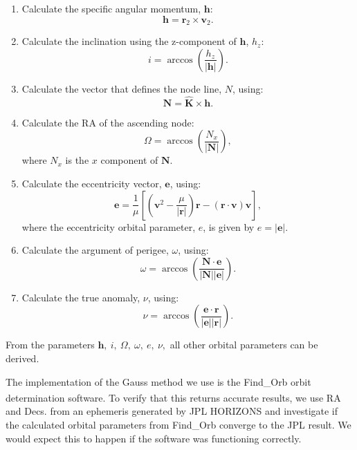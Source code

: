 \documentclass[10pt, twocolumn]{revtex4}    %
\newcommand{\scite}[1]{\textsuperscript{\cite{#1}}}
\begin{document}
\begin{enumerate}
 \item Calculate the specific angular momentum, $\mathbf{h}$:
 \begin{equation}
 \mathbf{h} = \mathbf{r}_2 \times \mathbf{v}_2 .
 \end{equation} 
 \item Calculate the inclination using the z-component of $\mathbf{h}$, $h_z$:
 \begin{equation}
 i = \arccos\left( \frac{h_z}{|\mathbf{h}|} \right) .
 \end{equation}
 \item Calculate the vector that defines the node line, $N$, using:
 \begin{equation}
 \mathbf{N} = \mathbf{\hat{K}} \times \mathbf{h} .
 \end{equation} 
 \item Calculate the RA of the ascending node:
 \begin{equation}
 \Omega = \arccos \left( \frac{N_x}{|\mathbf{N}|} \right) ,
 \end{equation}
 where $N_x$ is the $x$ component of $\mathbf{N}$.
 \item Calculate the eccentricity vector, $\mathbf{e}$, using:
 \begin{equation}
 \mathbf{e} = \frac{1}{\mu} \left[ \left(\mathbf{v}^2 - \frac{\mu}{|\mathbf{r}|} \right) \mathbf{r} - (\mathbf{r}\cdot\mathbf{v}) \mathbf{v} \right] ,
 \end{equation}
 where the eccentricity orbital parameter, $e$, is given by $e = |\mathbf{e}|$.
 \item Calculate the argument of perigee, $\omega$, using:
 \begin{equation}
 \omega = \arccos \left( \frac{\mathbf{N} \cdot \mathbf{e}}{|\mathbf{N}||\mathbf{e}|} \right) .
 \end{equation}
 \item Calculate the true anomaly, $\nu$, using:
 \begin{equation}
 \nu = \arccos \left( \frac{\mathbf{e} \cdot \mathbf{r}}{|\mathbf{e}||\mathbf{r}|} \right) .
 \end{equation}
\end{enumerate}
From the parameters $\mathbf{h},\ i,\ \Omega,\ \omega,\ e,\ \nu,$ all other orbital parameters can be derived.
\vspace{1ex}

The implementation of the Gauss method we use is the Find\_Orb orbit determination software.\scite{FindOrbOrbit} To verify that this returns accurate results, we use RA and Decs. from an ephemeris generated by JPL HORIZONS and investigate if the calculated orbital parameters from Find\_Orb converge to the JPL result. We would expect this to happen if the software was functioning correctly. 
\end{document}

